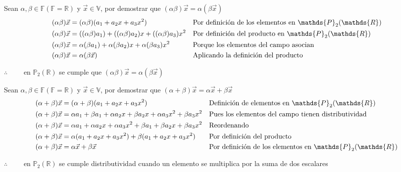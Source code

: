\documentclass[letterpaper]{article}
\newcommand{\V}{\mathds{V}}
\newcommand{\F}{\mathds{F}}
\newcommand{\R}{\mathds{R}}
\newcommand{\Po}{\mathds{P}_2(\mathds{R})}
\renewcommand{\*}{\cdot}
\theoremstyle{definition}
\begin{document}
Sean $ \alpha, \beta \in \F( \F = \R) $ y $ \vec{x} \in \V $, por demostrar que $ (\alpha\beta)\vec{x} = \alpha(\beta\vec{x}) $
\begin{align*}
	(\alpha\beta)\vec{x} &= (\alpha\beta)(a_1 + a_2x + a_3x^2) && \text{Por definición de los elementos en $ \Po $}\\
	(\alpha\beta)\vec{x} &= ((\alpha\beta)a_1) + ((\alpha\beta)a_2)x + ((\alpha\beta)a_3)x^2 && \text{Por definición del producto en $ \Po $}\\
	(\alpha\beta)\vec{x} &= \alpha(\beta a_1) + \alpha(\beta a_2)x + \alpha (\beta a_3)x^2 && \text{Porque los elementos del campo asocian}\\
	(\alpha\beta)\vec{x} &= \alpha(\beta\vec{x}) && \text{Aplicando la definición del producto }\\
\end{align*}
\begin{center}
	$ \therefore \qquad $ en $ \Po $ se cumple que $ (\alpha\beta)\vec{x} = \alpha(\beta\vec{x}) $
\end{center}

Sean $ \alpha, \beta \in \F( \F = \R) $ y $ \vec{x} \in \V $, por demostrar que $ (\alpha + \beta)\vec{x} = \alpha\vec{x} + \beta\vec{x} $
\begin{align*}
	(\alpha + \beta)\vec{x} &= (\alpha + \beta)(a_1 + a_2x + a_3x^2) && \text{Definición de elementos en $ \Po $}\\
	(\alpha + \beta)\vec{x} &= \alpha a_1 + \beta a_1 + \alpha a_2x + \beta a_2x + \alpha a_3x^2 + \beta a_3x^2 && \text{Pues los elementos del campo tienen distributividad}\\
	(\alpha + \beta)\vec{x} &= \alpha a_1 + \alpha a_2x + \alpha a_3x^2 + \beta a_1  + \beta a_2x  + \beta a_3x^2 && \text{Reordenando}\\
	(\alpha + \beta)\vec{x} &= \alpha(a_1 + a_2x + a_3x^2) + \beta(a_1 + a_2x + a_3x^2)&& \text{Por definición del producto}\\
	(\alpha + \beta)\vec{x} &= \alpha\vec{x} + \beta\vec{x}&& \text{Por definición de los elementos en $ \Po $}\\
\end{align*}
\begin{center}
	$ \therefore \qquad  $ en $ \Po $ se cumple distributividad cuando un elemento se multiplica por la suma de dos escalares
\end{center}
\end{document}
